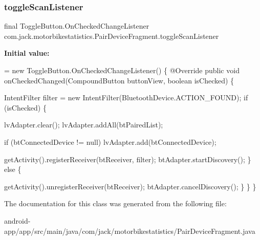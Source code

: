 \subsubsection{\texorpdfstring{toggle\+Scan\+Listener}{toggleScanListener}}
{\footnotesize\ttfamily final Toggle\+Button.\+On\+Checked\+Change\+Listener com.\+jack.\+motorbikestatistics.\+Pair\+Device\+Fragment.\+toggle\+Scan\+Listener}

{\bfseries Initial value\+:}
\begin{DoxyCode}
= \textcolor{keyword}{new} ToggleButton.OnCheckedChangeListener() \{
        @Override
        \textcolor{keyword}{public} \textcolor{keywordtype}{void} onCheckedChanged(CompoundButton buttonView, \textcolor{keywordtype}{boolean} isChecked) \{

            IntentFilter filter = \textcolor{keyword}{new} IntentFilter(BluetoothDevice.ACTION\_FOUND);
            \textcolor{keywordflow}{if} (isChecked)
            \{
                
                lvAdapter.clear();
                lvAdapter.addAll(btPairedList);

                \textcolor{keywordflow}{if} (btConnectedDevice != null)
                    lvAdapter.add(btConnectedDevice);

                getActivity().registerReceiver(btReceiver, filter);
                btAdapter.startDiscovery();
            \}
            \textcolor{keywordflow}{else}
            \{
                
                getActivity().unregisterReceiver(btReceiver);
                btAdapter.cancelDiscovery();
            \}
        \}
    \}
\end{DoxyCode}


The documentation for this class was generated from the following file\+:\begin{DoxyCompactItemize}
\item 
android-\/app/app/src/main/java/com/jack/motorbikestatistics/Pair\+Device\+Fragment.\+java\end{DoxyCompactItemize}

